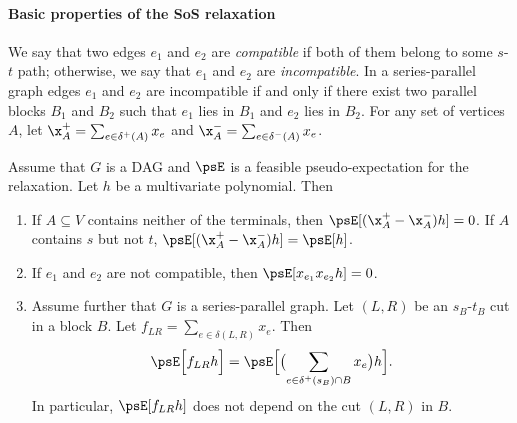 \documentclass[11pt,a4paper]{article}
\begin{document}
\paragraph{Basic properties of the SoS relaxation}
We say that two edges $e_1$ and $e_2$ are \emph{compatible} if both of them belong to some $s$-$t$ path; otherwise, we say that $e_1$ and $e_2$ are \emph{incompatible}. In a series-parallel graph edges $e_1$ and $e_2$ are incompatible if and only if there exist two parallel blocks \(B_1\) and \(B_2\) such that \(e_1\) lies in $B_1$ and \(e_2\) lies in \(B_2\).
For any set of vertices \(A\), let $\x^{+}_A = \sum_{e\in \delta^+(A)} x_{e}$ and  $\x^{-}_A = \sum_{e\in \delta^-(A)} x_{e}$.
\begin{claim} \label{claim:flow-basics}
Assume that $G$ is a DAG and $\psE$ is a feasible pseudo-expectation for the relaxation. Let $h$ be a multivariate polynomial. Then
\begin{enumerate}
\item If $A \subseteq V$ contains neither of the terminals, then $\psE[(\x^{+}_A - \x^{-}_A)h] = 0$. If $A$ contains $s$ but not $t$, $\psE[(\x^{+}_A - \x^{-}_A)h] = \psE[h]$.
\item If $e_1$ and $e_2$ are not compatible, then $\psE[x_{e_1}x_{e_2}h] = 0$.
\item Assume further that $G$ is a series-parallel graph. Let $(L, R)$ be an $s_B$-$t_B$ cut in a block $B$. Let $f_{LR} = \sum_{e\in \delta(L,R)} x_e$. 
 Then 
$$\psE\Bigl[f_{LR}h\Bigr] = \psE\Bigl[\bigl(\sum_{e\in \delta^+(s_B) \cap B} x_e\bigr)h\Bigr].$$
In particular, $\psE[f_{LR}h]$ does not depend on the cut $(L,R)$ in $B$.
\end{enumerate}
\end{claim}
\end{document}
